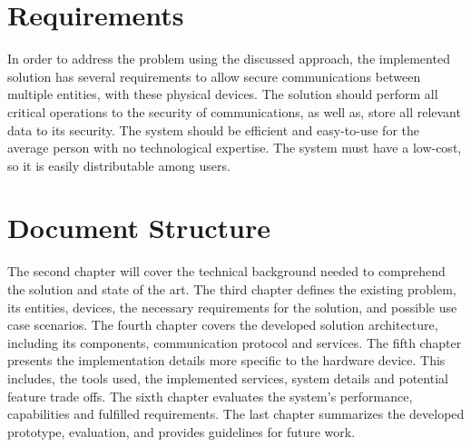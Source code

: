 \section{Requirements}\label{chap:intro:requirements}

In order to address the problem using the discussed approach, the implemented solution has several requirements to allow secure communications between multiple entities, with these physical devices.
The solution should perform all critical operations to the security of communications, as well as, store all relevant data to its security.
The system should be efficient and easy-to-use for the average person with no technological expertise. The system must have a low-cost, so it is easily distributable among users.

\section{Document Structure}\label{chap:intro:doc}

The second chapter will cover the technical background needed to comprehend the solution and state of the art.
The third chapter defines the existing problem, its entities, devices, the necessary requirements for the solution, and possible use case scenarios.
The fourth chapter covers the developed solution architecture, including its components, communication protocol and services.
The fifth chapter presents the implementation details more specific to the hardware device. This includes, the tools used, the implemented services, system details and potential feature trade offs. The sixth chapter evaluates the system's performance, capabilities and fulfilled requirements. The last chapter summarizes the developed prototype, evaluation, and provides guidelines for future work.
